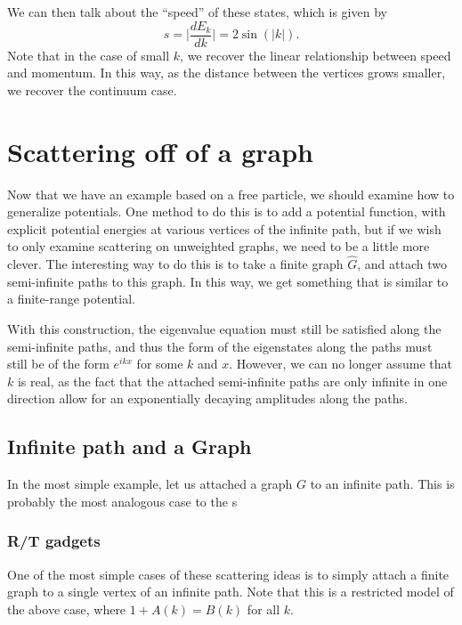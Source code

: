 We can then talk about the ``speed'' of these states, which is given by
\begin{equation}
  s = \Big| \frac{d E_k}{d k} \Big| = 2 \sin (|k|).
\end{equation}
Note that in the case of small $k$, we recover the linear relationship between speed and momentum.  In this way, as the distance between the vertices grows smaller, we recover the continuum case.



\section{Scattering off of a graph}

Now that we have an example based on a free particle, we should examine how to generalize potentials.  One method to do this is to add a potential function, with explicit potential energies at various vertices of the infinite path, but if we wish to only examine scattering on unweighted graphs, we need to be a little more clever.  The interesting way to do this is to take a finite graph $\hat{G}$, and attach two semi-infinite paths to this graph.  In this way, we get something that is similar to a finite-range potential.

With this construction, the eigenvalue equation must still be satisfied along the semi-infinite paths, and thus the form of the eigenstates along the paths must still be of the form $e^{i k x}$ for some $k$ and $x$.  However, we can no longer assume that $k$ is real, as the fact that the attached semi-infinite paths are only infinite in one direction allow for an exponentially decaying amplitudes along the paths.


\subsection{Infinite path and a Graph}

In the most simple example, let us attached a graph $G$ to an infinite path.  This is probably the most analogous case to the s

\subsubsection{R/T gadgets}

One of the most simple cases of these scattering ideas is to simply attach a finite graph to a single vertex of an infinite path.  Note that this is a restricted model of the above case, where $1 + A(k) = B(k)$ for all $k$.  


